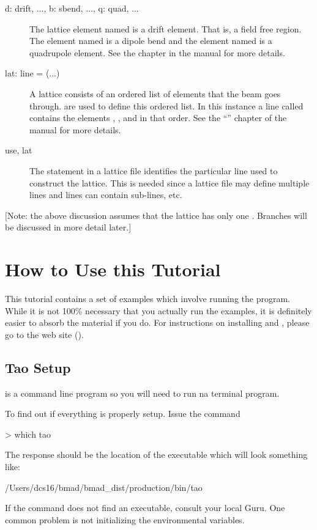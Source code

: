 \documentclass{hitec}
\newcommand{\Section}[1]{\section{#1}\vspace*{-1ex}}
\begin{document}
\begin{description}
  \item[d: drift, ..., b: sbend, ..., q: quad, ...] \Newline
The lattice element named  is a drift element. That is, a field free region. The element named 
is a dipole bend and the element named  is a quadrupole element. See the 
chapter in the \bmad manual for more details.
  \item[lat: line = (...)] \Newline
A lattice consists of an ordered list of elements that the beam goes through.  are used
to define this ordered list. In this instance a line called  contains the elements
, , and  in that order. 
See the ``'' chapter of the \bmad manual for more details.
  \item[use, lat] \Newline
The  statement in a lattice file identifies the particular line used to construct the
lattice. This is needed since a lattice file may define multiple lines and lines can contain
sub-lines, etc.
  \end{description}

[Note: the above discussion assumes that the lattice has only one . Branches will be
discussed in more detail later.]

\Section{How to Use this Tutorial}

This tutorial contains a set of examples which involve running the \tao program.  While it is not
100\% necessary that you actually run the examples, it is definitely easier to absorb the material
if you do. For instructions on installing \bmad and \tao, please go to the \bmad web site
().

\subsection{Tao Setup}

\tao is a command line program so you will need to run na terminal program.

To find out if everything is properly setup. Issue the command
\begin{code}
> which tao
\end{code}
The response should be the location of the \tao executable which will look something like:
\begin{code}
/Users/dcs16/bmad/bmad_dist/production/bin/tao
\end{code}
If the  command does not find an executable, consult your local \bmad Guru. One common
problem is not initializing the \bmad environmental variables.
\end{document}
